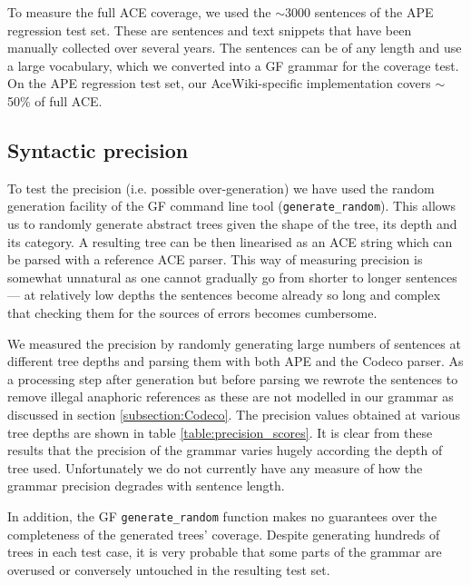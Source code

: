 \documentclass[a4paper]{article}
\begin{document}
To measure the full ACE coverage, we used the $\sim$3000 sentences of the
APE regression test set. These are sentences and text
snippets that have been manually collected over several years. The sentences
can be of any length and use a large vocabulary, which we converted into
a GF grammar for the coverage test.
On the APE regression test set, our AceWiki-specific implementation covers
$\sim$50\% of full ACE.

\subsection{Syntactic precision}

To test the precision (i.e. possible over-generation) we have used the
random generation facility of the GF command line tool
(\verb!generate_random!). This allows us to randomly generate abstract
trees given the shape of the tree, its depth and its category. A
resulting tree can be then linearised as an ACE string which can be
parsed with a reference ACE parser.  This way of measuring precision
is somewhat unnatural as one cannot gradually go from shorter to
longer sentences --- at relatively low depths the sentences become
already so long and complex that checking them for the sources of
errors becomes cumbersome.

We measured the precision by randomly generating large numbers of
sentences at different tree depths and parsing them with both APE
and the Codeco parser. As a processing step after
generation but before parsing we rewrote the sentences to remove
illegal anaphoric references as these are not modelled in our grammar
as discussed in section \ref{subsection:Codeco}.  The precision values
obtained at various tree depths are shown in table
\ref{table:precision_scores}. It is clear from these results that the
precision of the grammar varies hugely according the depth of tree
used. Unfortunately we do not currently have any measure of how the grammar
precision degrades with sentence length.

In addition, the GF \verb!generate_random! function makes no
guarantees over the completeness of the generated trees'
coverage. Despite generating hundreds of trees in each test case, it
is very probable that some parts of the grammar are overused or
conversely untouched in the resulting test set.
\end{document}
